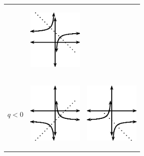 \begin{center}
\begin{xtabular*}{\mytablewidth}[t]{|p{10\mystarwidth}|p{10\mystarwidth}|p{10\mystarwidth}|}
\begin{center}
\end{center}    
    &
\setcounter{subfigure}{0}
\label{m39341*id246943}
\begin{center}
\label{m39341*id246943!!!underscore!!!media}\label{m39341*id246943!!!underscore!!!printimage}\includegraphics[width=100px]{col11306.imgs/m39341_MG10C11_023.png} %
\vspace{2pt}
\vspace{.1in}
\end{center}    
\tabularnewline{}
    $q<0$
    &
\setcounter{subfigure}{0}
\label{m39341*id246981}
\begin{center}
\label{m39341*id246981!!!underscore!!!media}\label{m39341*id246981!!!underscore!!!printimage}\includegraphics[width=100px]{col11306.imgs/m39341_MG10C11_024.png} %
\vspace{2pt}
\vspace{.1in}
\end{center}    
    &
\setcounter{subfigure}{0}
\label{m39341*id246993}
\begin{center}
\label{m39341*id246993!!!underscore!!!media}\label{m39341*id246993!!!underscore!!!printimage}\includegraphics[width=100px]{col11306.imgs/m39341_MG10C11_025.png} %

\end{center}
\end{xtabular*}
\end{center}
